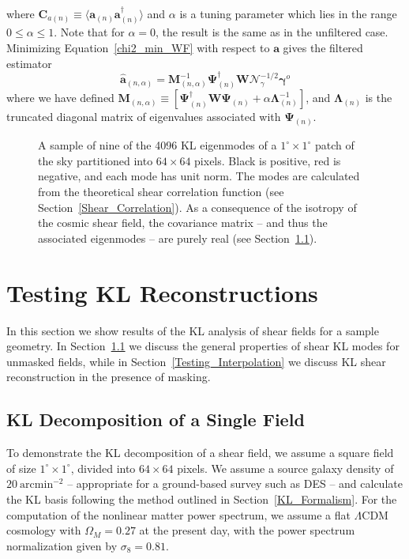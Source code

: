 \documentclass[twocolumn]{emulateapj}
\newcommand{\myvec}[1]{\boldsymbol{#1}}
\newcommand{\mymat}[1]{\boldsymbol{#1}}
\newcommand{\Noise}{\mymat{\mathcal{N}}}
\begin{document}
where $\myvec{C}_{a(n)}\equiv\langle 
\myvec{a}_{(n)}\myvec{a}_{(n)}^\dagger\rangle$ 
and $\alpha$ is a tuning parameter which lies in the range $0\le\alpha\le 1$. 
Note that for $\alpha=0$, the result is the same as in the unfiltered case.
Minimizing Equation~\ref{chi2_min_WF} with respect to $\myvec{a}$ gives the
filtered estimator
\begin{equation}
  \label{a_WF}
  \myvec{\hat{a}}_{(n,\alpha)} = 
  \mymat{M}_{(n,\alpha)}^{-1} 
  \myvec{\Psi}_{(n)}^\dagger \myvec{W} \Noise_\gamma^{-1/2}\myvec{\gamma}^o
\end{equation}
where we have defined $\mymat{M}_{(n,\alpha)} 
\equiv [\myvec{\Psi}_{(n)}^\dagger\myvec{W}\myvec{\Psi}_{(n)} 
  + \alpha\myvec{\Lambda}_{(n)}^{-1}]$, and
$\myvec{\Lambda}_{(n)}$ is the truncated diagonal matrix of 
eigenvalues associated with $\myvec{\Psi}_{(n)}$.

\begin{figure*}
 \centering
 \caption{
   A sample of nine of the 4096 KL eigenmodes 
   of a $1^\circ\times 1^\circ$ patch of the sky partitioned into
   $64\times 64$ pixels.  Black is positive, red is negative, and each mode
   has unit norm. The modes are calculated from the theoretical
   shear correlation function (see Section~\ref{Shear_Correlation}).  
   As a consequence of the isotropy of the cosmic shear field,
   the covariance matrix -- and thus the associated eigenmodes --
   are purely real (see Section~\ref{Testing_Shear_KL}).
   \label{fig_KL_modes} }
\end{figure*} 

\section{Testing KL Reconstructions}
\label{Testing_Reconstruction}
In this section we show results of the KL analysis of shear fields for
a sample geometry.  In Section~\ref{Testing_Shear_KL} we discuss the general
properties of shear KL modes for unmasked fields, while in
Section~\ref{Testing_Interpolation} we discuss KL shear reconstruction 
in the presence of masking. 

\subsection{KL Decomposition of a Single Field}
\label{Testing_Shear_KL}
To demonstrate the KL decomposition of a shear field, we assume a square field
of size $1^\circ\times 1^\circ$, divided into $64\times 64$ pixels.  We assume
a source galaxy density of $20\ \mathrm{arcmin}^{-2}$ -- appropriate for a
ground-based survey such as DES -- and calculate the
KL basis following the method outlined in Section~\ref{KL_Formalism}.
For the computation of the nonlinear matter power spectrum, we assume a flat 
$\Lambda$CDM cosmology with $\Omega_M=0.27$ at the present day, with
the power spectrum normalization given by $\sigma_8=0.81$.
\end{document}
